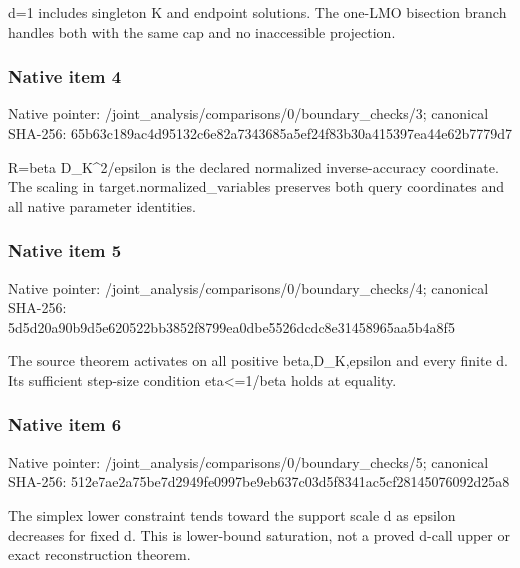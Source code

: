 \documentclass[10pt,a4paper]{article}
\begin{document}
\begingroup\raggedright\sloppy d=\allowbreak{}1 includes singleton K and endpoint solutions. The one-LMO bisection branch handles both with the same cap and no inaccessible projection.\par\endgroup

\subsubsection{Native item 4}
Native pointer: /joint\_\allowbreak{}analysis/comparisons/0/boundary\_\allowbreak{}checks/3; canonical SHA-256: 65b63c189ac4d95132c6e82a7343685a5ef24f83b30a415397ea44e62b7779d7

\begingroup\raggedright\sloppy R=\allowbreak{}beta D\_\allowbreak{}K\textasciicircum{}2/\allowbreak{}epsilon is the declared normalized inverse-accuracy coordinate. The scaling in target.normalized\_\allowbreak{}variables preserves both query coordinates and all native parameter identities.\par\endgroup

\subsubsection{Native item 5}
Native pointer: /joint\_\allowbreak{}analysis/comparisons/0/boundary\_\allowbreak{}checks/4; canonical SHA-256: 5d5d20a90b9d5e620522bb3852f8799ea0dbe5526dcdc8e31458965aa5b4a8f5

\begingroup\raggedright\sloppy The source theorem activates on all positive beta,\allowbreak{}D\_\allowbreak{}K,\allowbreak{}epsilon and every finite d. Its sufficient step-size condition eta<=\allowbreak{}1/\allowbreak{}beta holds at equality.\par\endgroup

\subsubsection{Native item 6}
Native pointer: /joint\_\allowbreak{}analysis/comparisons/0/boundary\_\allowbreak{}checks/5; canonical SHA-256: 512e7ae2a75be7d2949fe0997be9eb637c03d5f8341ac5cf28145076092d25a8

\begingroup\raggedright\sloppy The simplex lower constraint tends toward the support scale d as epsilon decreases for fixed d. This is lower-bound saturation,\allowbreak{} not a proved d-call upper or exact reconstruction theorem.\par\endgroup
\end{document}
